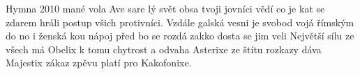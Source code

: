 \begin{TEXT}{Hymna 2010}
\SLOKA {}mané vola Ave sare \NL
{}lý svět obsa tvoji jovníci\NL
{}vědí co je kat se zdarem \NL
{}hráli postup všich protivníci. 
\REFREN  Vzdále galská  vesni je svobod \NL
vojá římským  do no i ženská \NL
kou nápoj  před bo se rozdá\NL
zakko dosta se jim  veli
\SLOKA Největší sílu ze všech má Obelix \NL
k tomu chytrost a odvaha Asterixe\NL
ze štítu rozkazy dáva Majestix\NL
zákaz zpěvu platí pro Kakofonixe.\NL
\end{TEXT}
